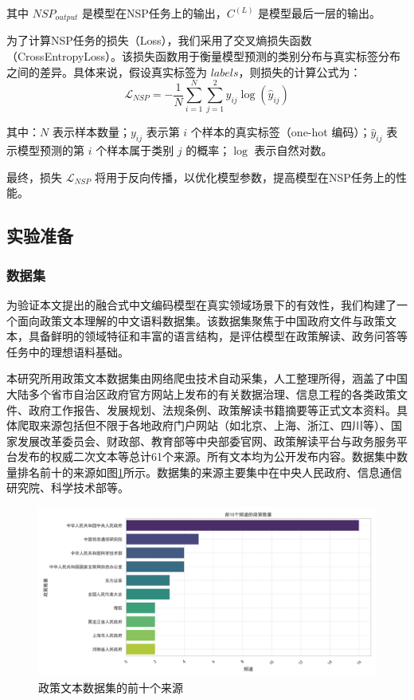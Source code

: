 \documentclass[12pt, a4paper]{ctexart}
\begin{document}
其中 $NSP_{output}$ 是模型在NSP任务上的输出，$C^{(L)}$ 是模型最后一层的输出。

为了计算NSP任务的损失（Loss），我们采用了交叉熵损失函数（CrossEntropyLoss）。该损失函数用于衡量模型预测的类别分布与真实标签分布之间的差异。具体来说，假设真实标签为 $labels$，则损失的计算公式为：
\begin{equation}
    \mathcal{L}_{NSP} = -\frac{1}{N} \sum_{i=1}^{N} \sum_{j=1}^{2} y_{ij} \log(\hat{y}_{ij})
\end{equation}

其中：$N$ 表示样本数量；$y_{ij}$ 表示第 $i$ 个样本的真实标签（one-hot 编码）；$\hat{y}_{ij}$ 表示模型预测的第 $i$ 个样本属于类别 $j$ 的概率；$\log$ 表示自然对数。


最终，损失 $\mathcal{L}_{NSP}$ 将用于反向传播，以优化模型参数，提高模型在NSP任务上的性能。
\subsection{实验准备}
\subsubsection{数据集}
为验证本文提出的融合式中文编码模型在真实领域场景下的有效性，我们构建了一个面向政策文本理解的中文语料数据集。该数据集聚焦于中国政府文件与政策文本，具备鲜明的领域特征和丰富的语言结构，是评估模型在政策解读、政务问答等任务中的理想语料基础。

本研究所用政策文本数据集由网络爬虫技术自动采集，人工整理所得，涵盖了中国大陆多个省市自治区政府官方网站上发布的有关数据治理、信息工程的各类政策文件、政府工作报告、发展规划、法规条例、政策解读书籍摘要等正式文本资料。具体爬取来源包括但不限于各地政府门户网站（如北京、上海、浙江、四川等）、国家发展改革委员会、财政部、教育部等中央部委官网、政策解读平台与政务服务平台发布的权威二次文本等总计61个来源。所有文本均为公开发布内容。数据集中数量排名前十的来源如图\ref{fig:top_10_channels_policy_count}所示。数据集的来源主要集中在中央人民政府、信息通信研究院、科学技术部等。

\begin{figure}
    \centering
    \includegraphics[width=1\textwidth]{images/top_10_channels_policy_count.png}
    \caption{政策文本数据集的前十个来源}
    \label{fig:top_10_channels_policy_count}
\end{figure}
\end{document}
